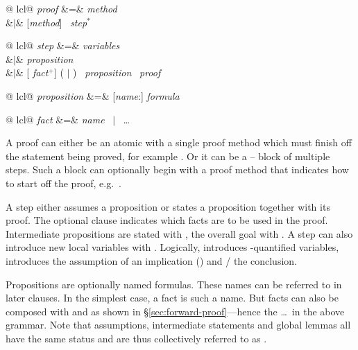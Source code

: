 \begin{isabellebody}
\begin{isamarkuptext}
\begin{tabular}{@ {}lcl@ {}}
\textit{proof} &=&  \textit{method}\\
      &$\mid$&  [\textit{method}] \ \textit{step}$^*$ \ 
\end{tabular}
\medskip

\begin{tabular}{@ {}lcl@ {}}
\textit{step} &=&  \textit{variables} \\
      &$\mid$&  \textit{proposition} \\
      &$\mid$& [ \textit{fact}$^+$] ( $\mid$ ) \ \textit{proposition} \ \textit{proof}
\end{tabular}
\medskip

\begin{tabular}{@ {}lcl@ {}}
\textit{proposition} &=& [\textit{name}:] \textit{formula}
\end{tabular}
\medskip

\begin{tabular}{@ {}lcl@ {}}
\textit{fact} &=& \textit{name} \ $\mid$ \ \dots
\end{tabular}
\medskip

\noindent A proof can either be an atomic  with a single proof
method which must finish off the statement being proved, for example .  Or it can be a -- block of multiple
steps. Such a block can optionally begin with a proof method that indicates
how to start off the proof, e.g.\ \mbox{}.

A step either assumes a proposition or states a proposition
together with its proof. The optional  clause
indicates which facts are to be used in the proof.
Intermediate propositions are stated with , the overall goal
with . A step can also introduce new local variables with
. Logically,  introduces -quantified
variables,  introduces the assumption of an implication
() and / the conclusion.

Propositions are optionally named formulas. These names can be referred to in
later  clauses. In the simplest case, a fact is such a name.
But facts can also be composed with  and  as shown in
\S\ref{sec:forward-proof}---hence the \dots\ in the above grammar.  Note
that assumptions, intermediate  statements and global lemmas all
have the same status and are thus collectively referred to as
.


\end{isamarkuptext}
\end{isabellebody}
